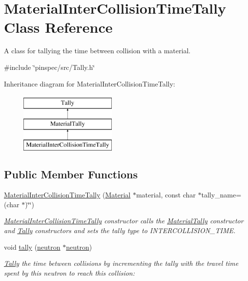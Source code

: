 \hypertarget{classMaterialInterCollisionTimeTally}{\section{Material\-Inter\-Collision\-Time\-Tally Class Reference}
\label{classMaterialInterCollisionTimeTally}
}


A class for tallying the time between collision with a material.  




{\ttfamily \#include \char`\"{}pinspec/src/\-Tally.\-h\char`\"{}}

Inheritance diagram for Material\-Inter\-Collision\-Time\-Tally\-:\begin{figure}[H]
\begin{center}
\leavevmode
\includegraphics[height=3.000000cm]{classMaterialInterCollisionTimeTally}
\end{center}
\end{figure}
\subsection*{Public Member Functions}
\begin{DoxyCompactItemize}
\item 
\hyperlink{classMaterialInterCollisionTimeTally_a76049b7e29408581586c8f8ae1b50293}{Material\-Inter\-Collision\-Time\-Tally} (\hyperlink{classMaterial}{Material} $\ast$material, const char $\ast$tally\-\_\-name=(char $\ast$)\char`\"{}\char`\"{})
\begin{DoxyCompactList}\small\item\em \hyperlink{classMaterialInterCollisionTimeTally}{Material\-Inter\-Collision\-Time\-Tally} constructor calls the \hyperlink{classMaterialTally}{Material\-Tally} constructor and \hyperlink{classTally}{Tally} constructors and sets the tally type to I\-N\-T\-E\-R\-C\-O\-L\-L\-I\-S\-I\-O\-N\-\_\-\-T\-I\-M\-E. \end{DoxyCompactList}\item 
void \hyperlink{classMaterialInterCollisionTimeTally_a339ebb3a0367954d650006acc72185b9}{tally} (\hyperlink{structneutron}{neutron} $\ast$\hyperlink{structneutron}{neutron})
\begin{DoxyCompactList}\small\item\em \hyperlink{classTally}{Tally} the time between collisions by incrementing the tally with the travel time spent by this neutron to reach this collision\-: \end{DoxyCompactList}\end{DoxyCompactItemize}
